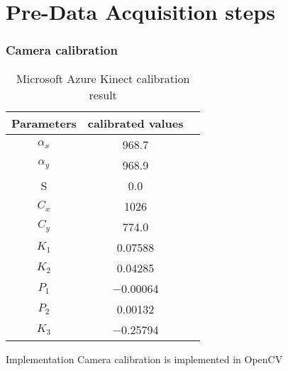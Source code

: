 \section{Pre-Data Acquisition steps}
\begin{frame}
	\frametitle{Camera calibration}
		\begin{table}[hbt]
			\centering
			\begin{tabular}{|c|c|c|}
				\hline
				Parameters & calibrated values \\ 
				\hline
				$\alpha_x$  & \num{968.7}  \\
				$\alpha_y$ & \num{968.9} \\
				S & 0.0 \\
				$C_x$ & \num{1026} \\
				$C_y$ & \num{774.0} \\
				$K_1$ & \num{0.07588} \\
				$K_2$ & \num{0.04285}  \\
				$P_1$ & \num{-0.00064} \\
				$P_2$ & \num{0.00132}  \\
				$K_3$ & \num{-0.25794} \\
				\hline
			\end{tabular}
			\caption{Microsoft Azure Kinect calibration result}
			\label{tab:kinect_camera_calibration_result}
		\end{table}
	\begin{block}{Implementation}
		Camera calibration is implemented in OpenCV
	\end{block}
		
\end{frame}
